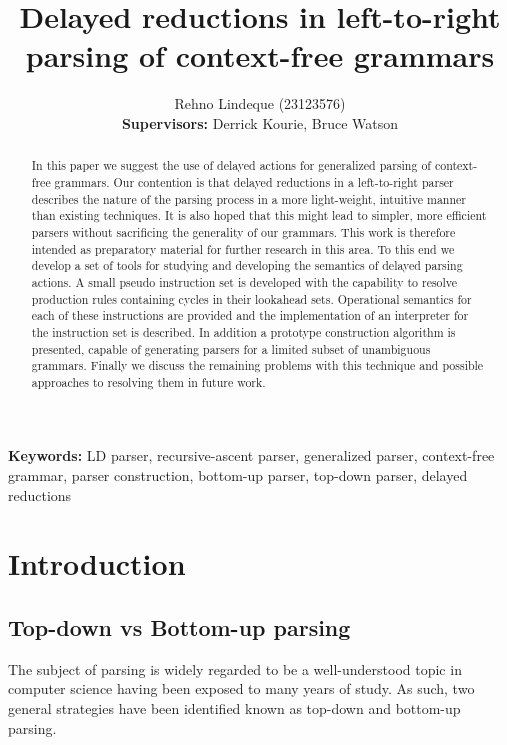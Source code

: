 \documentclass[a4paper,11pt]{article}
\begin{document}
\title{Delayed reductions in left-to-right parsing of context-free grammars}
\author{Rehno Lindeque (23123576)\\
\textbf{Supervisors:} Derrick Kourie, Bruce Watson}

\maketitle

\begin{abstract}
In this paper we suggest the use of delayed actions for generalized parsing of context-free grammars.
Our contention is that delayed reductions in a left-to-right parser describes the nature of the parsing process in a more light-weight, intuitive manner than existing techniques.
It is also hoped that this might lead to simpler, more efficient parsers without sacrificing the generality of our grammars.
This work is therefore intended as preparatory material for further research in this area.
To this end we develop a set of tools for studying and developing the semantics of delayed parsing actions.
A small pseudo instruction set is developed with the capability to resolve production rules containing cycles in their lookahead sets.
Operational semantics for each of these instructions are provided and the implementation of an interpreter for the instruction set is described.
In addition a prototype construction algorithm is presented, capable of generating parsers for a limited subset of unambiguous grammars.
Finally we discuss the remaining problems with this technique and possible approaches to resolving them in future work.\\
\end{abstract}

\textbf{Keywords:} LD parser, recursive-ascent parser, generalized parser, context-free grammar, parser construction, bottom-up parser, top-down parser, delayed reductions

\section{Introduction}

\subsection{Top-down vs Bottom-up parsing}

The subject of parsing is widely regarded to be a well-understood topic in computer science having been exposed to many years of study.
As such, two general strategies have been identified known as top-down and bottom-up parsing.
\end{document}
